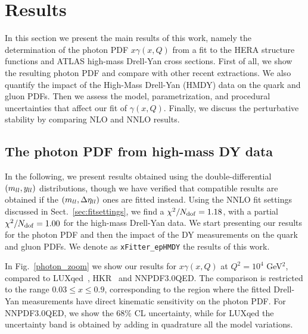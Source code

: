 \section{Results}
\label{sec:results}

In this section we present the main results of this work, namely the
determination of the photon PDF $x\gamma(x,Q)$ from a fit to the
HERA structure functions and ATLAS high-mass Drell-Yan cross sections.
%
First of all, we show the resulting photon PDF and compare with other
recent extractions.
%
We also quantify the impact of the High-Mass Drell-Yan (HMDY) data on
the quark and gluon PDFs.
%
Then we assess the model, parametrization, and procedural
uncertainties that affect our fit of $\gamma(x,Q)$.
%
Finally, we discuss the perturbative stability by comparing NLO and
NNLO results.

\subsection{The photon PDF from high-mass DY data}

In the following, we present results obtained using the
double-differential $\left( m_{ll},y_{ll}\right)$ distributions, though we
have verified that compatible results are obtained if the
$\left( m_{ll},\Delta\eta_{ll}\right)$ ones are fitted instead.
%
Using the NNLO fit settings discussed in Sect.~\ref{sec:fitsettings},
we find a $\chi^{2}/N_{\rm dof} = 1.18$, with a partial
$\chi^2/N_{\rm dof} = 1.00$ for the high-mass Drell-Yan data.
%
We start presenting our results for the photon PDF and then the impact
of the DY measurements on the quark and gluon PDFs.
%
We denote as {\tt xFitter\_epHMDY} the results of this work.

In Fig.~\ref{photon_zoom} we show our results for $x\gamma(x,Q)$ at
$Q^2=10^4$ GeV$^2$, compared to LUXqed~\cite{Manohar:2016nzj},
HKR~\cite{Harland-Lang:2016apc} and NNPDF3.0QED.
%
The comparison is restricted to the range $0.03 \le x \le 0.9$,
corresponding to the region where the fitted Drell-Yan measurements
have direct kinematic sensitivity on the photon PDF.
%
For NNPDF3.0QED, we show the 68\% CL uncertainty, while for LUXqed the
uncertainty band is obtained by adding in quadrature all the model
variations.

